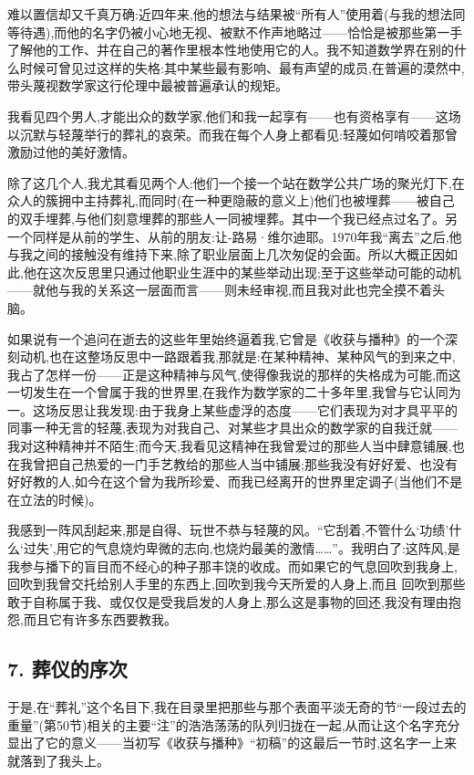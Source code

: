  难以置信却又千真万确:近四年来,他的想法与结果被“所有人”使用着(与我的想法同等待遇),而他的名字仍被小心地无视、被默不作声地略过——恰恰是被那些第一手了解他的工作、并在自己的著作里根本性地使用它的人。我不知道数学界在别的什么时候可曾见过这样的失格:其中某些最有影响、最有声望的成员,在普遍的漠然中,带头蔑视数学家这行伦理中最被普遍承认的规矩。

我看见四个男人,才能出众的数学家,他们和我一起享有——也有资格享有——这场以沉默与轻蔑举行的葬礼的哀荣。而我在每个人身上都看见:轻蔑如何啃咬着那曾激励过他的美好激情。

除了这几个人,我尤其看见两个人:他们一个接一个站在数学公共广场的聚光灯下,在众人的簇拥中主持葬礼,而同时(在一种更隐蔽的意义上)他们也被埋葬——被自己的双手埋葬,与他们刻意埋葬的那些人一同被埋葬。其中一个我已经点过名了。另一个同样是从前的学生、从前的朋友:让-路易·维尔迪耶。1970年我“离去”之后,他与我之间的接触没有维持下来,除了职业层面上几次匆促的会面。所以大概正因如此,他在这次反思里只通过他职业生涯中的某些举动出现;至于这些举动可能的动机——就他与我的关系这一层面而言——则未经审视,而且我对此也完全摸不着头脑。

如果说有一个追问在逝去的这些年里始终逼着我,它曾是《收获与播种》的一个深刻动机,也在这整场反思中一路跟着我,那就是:在某种精神、某种风气的到来之中,我占了怎样一份——正是这种精神与风气,使得像我说的那样的失格成为可能,而这一切发生在一个曾属于我的世界里,在我作为数学家的二十多年里,我曾与它认同为一。这场反思让我发现:由于我身上某些虚浮的态度——它们表现为对才具平平的同事一种无言的轻蔑,表现为对我自己、对某些才具出众的数学家的自我迁就——我对这种精神并不陌生;而今天,我看见这精神在我曾爱过的那些人当中肆意铺展,也在我曾把自己热爱的一门手艺教给的那些人当中铺展;那些我没有好好爱、也没有好好教的人,如今在这个曾为我所珍爱、而我已经离开的世界里定调子(当他们不是在立法的时候)。

我感到一阵风刮起来,那是自得、玩世不恭与轻蔑的风。“它刮着,不管什么‘功绩’什么‘过失’,用它的气息烧灼卑微的志向,也烧灼最美的激情……”。我明白了:这阵风,是我参与播下的盲目而不经心的种子那丰饶的收成。而如果它的气息回吹到我身上,回吹到我曾交托给别人手里的东西上,回吹到我今天所爱的人身上,而且
%
 回吹到那些敢于自称属于我、或仅仅是受我启发的人身上,那么这是事物的回还,我没有理由抱怨,而且它有许多东西要教我。

\subsection{7. 葬仪的序次}

于是,在“葬礼”这个名目下,我在目录里把那些与那个表面平淡无奇的节“一段过去的重量”(第50节)相关的主要“注”的浩浩荡荡的队列归拢在一起,从而让这个名字充分显出了它的意义——当初写《收获与播种》“初稿”的这最后一节时,这名字一上来就落到了我头上。

